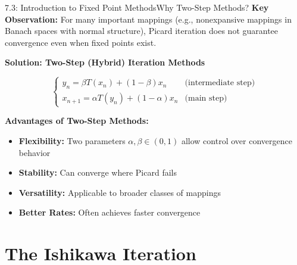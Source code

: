 \documentclass[aspectratio=169,10pt]{beamer}
\begin{document}
\begin{frame}{7.3: Introduction to Fixed Point Methods}{Why Two-Step Methods?}
\textbf{Key Observation:} For many important mappings (e.g., nonexpansive mappings in Banach spaces with normal structure), Picard iteration does not guarantee convergence even when fixed points exist.

\vspace{0.3cm}

\textbf{Solution: Two-Step (Hybrid) Iteration Methods}

\[
\begin{cases}
y_n = \beta T(x_n) + (1 - \beta) x_n & \text{(intermediate step)} \\
x_{n+1} = \alpha T(y_n) + (1 - \alpha) x_n & \text{(main step)}
\end{cases}
\]

\vspace{0.3cm}

\textbf{Advantages of Two-Step Methods:}
\begin{itemize}
    \item \textbf{Flexibility:} Two parameters $\alpha, \beta \in (0,1)$ allow control over convergence behavior
    \item \textbf{Stability:} Can converge where Picard fails
    \item \textbf{Versatility:} Applicable to broader classes of mappings
    \item \textbf{Better Rates:} Often achieves faster convergence
\end{itemize}
\end{frame}

\section{The Ishikawa Iteration}
\end{document}
